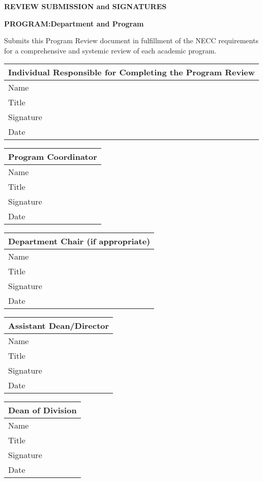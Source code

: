 \textbf{ REVIEW SUBMISSION and SIGNATURES}

\textbf{PROGRAM:Department and Program}

Submits this Program Review document in fulfillment of the NECC requirements for a comprehensive and systemic review of each academic program.


\begin{tabular}{ |p{3cm}||p{10cm}| }
 \hline
 \multicolumn{2}{|c|}{\textbf{Individual Responsible for Completing the Program Review}} \\
 \hline
 Name &  \\
 \hline
 Title   &  \\
  \hline
Signature &  \\
 \hline
Date & \\
 \hline
\end{tabular}


\begin{tabular}{ |p{3cm}||p{10cm}| }
 \hline
 \multicolumn{2}{|c|}{\textbf{Program Coordinator}} \\
 \hline
 Name &  \\
 \hline
 Title   &  \\
  \hline
Signature &  \\
 \hline
Date & \\
 \hline
\end{tabular}

\begin{tabular}{ |p{3cm}||p{10cm}| }
 \hline
 \multicolumn{2}{|c|}{\textbf{Department Chair (if appropriate)}} \\
 \hline
 Name &  \\
 \hline
 Title   &  \\
  \hline
Signature &  \\
 \hline
Date & \\
 \hline
\end{tabular}


\begin{tabular}{ |p{3cm}||p{10cm}| }
 \hline
 \multicolumn{2}{|c|}{\textbf{Assistant Dean/Director}} \\
 \hline
 Name &  \\
 \hline
 Title   &  \\
  \hline
Signature &  \\
 \hline
Date & \\
 \hline
\end{tabular}

\begin{tabular}{ |p{3cm}||p{10cm}| }
 \hline
 \multicolumn{2}{|c|}{\textbf{Dean of Division}} \\
 \hline
 Name &  \\
 \hline
 Title   &  \\
  \hline
Signature &  \\
 \hline
Date & \\
 \hline
\end{tabular}
